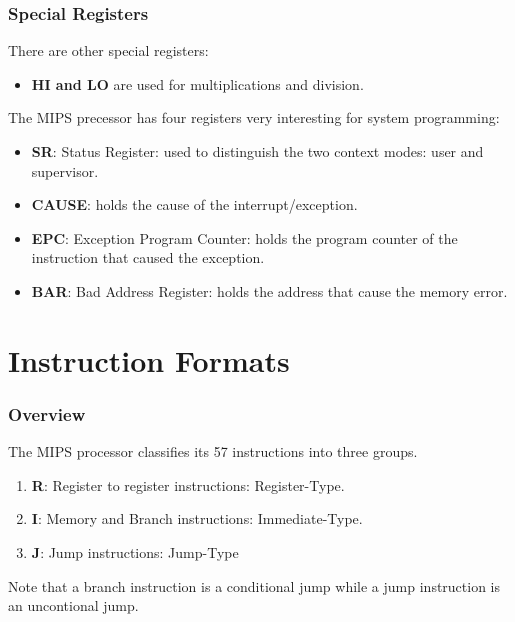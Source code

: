 
\begin{frame}
  \frametitle{Special Registers}

  There are other special registers:

  \begin{itemize}[<+->]
    \item
      \textbf{HI and LO} are used for multiplications and division.
  \end{itemize}

  The MIPS precessor has four registers very interesting for system
  programming:

  \begin{itemize}[<+->]
    \item
      \textbf{SR}: Status Register: used to distinguish the two context
      modes: user and supervisor.
    \item
      \textbf{CAUSE}: holds the cause of the interrupt/exception.
    \item
      \textbf{EPC}: Exception Program Counter: holds the program counter
      of the instruction that caused the exception.
    \item
      \textbf{BAR}: Bad Address Register: holds the address that cause
      the memory error.
  \end{itemize}
\end{frame}

%
%

\section{Instruction Formats}


\begin{frame}
  \frametitle{Overview}

  The MIPS processor classifies its 57 instructions into three groups.

  \begin{enumerate}[<+->]
    \item
      \textbf{R}: Register to register instructions: Register-Type.
    \item
      \textbf{I}: Memory and Branch instructions: Immediate-Type.
    \item
      \textbf{J}: Jump instructions: Jump-Type
  \end{enumerate}

  Note that a branch instruction is a conditional jump while a jump
  instruction is an uncontional jump.
\end{frame}


